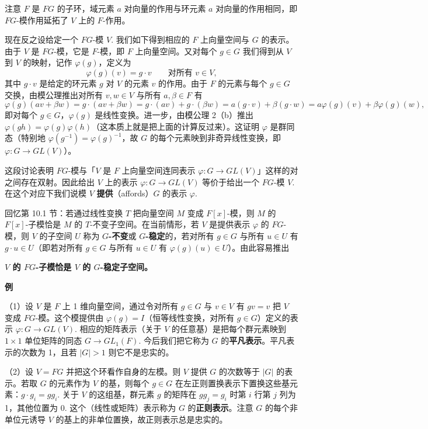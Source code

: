 注意 \(F\) 是 \(FG\) 的子环，域元素 \(a\) 对向量的作用与环元素 \(a\) 对向量的作用相同，即 \(FG\)-模作用延拓了 \(V\) 上的 \(F\)-作用。

现在反之设给定一个 \(FG\)-模 \(V\). 我们如下得到相应的 \(F\) 上向量空间与 \(G\) 的表示。由于 \(V\) 是 \(FG\)-模，它是 \(F\)-模，即 \(F\) 上向量空间。又对每个 \(g \in G\) 我们得到从 \(V\) 到 \(V\) 的映射，记作 \(\varphi(g)\)，定义为
\[
\varphi(g)(v) = g \cdot v \qquad \text{对所有 } v \in V,
\]
其中 \(g \cdot v\) 是给定的环元素 \(g\) 对 \(V\) 的元素 \(v\) 的作用。由于 \(F\) 的元素与每个 \(g \in G\) 交换，由模公理推出对所有 \(v, w \in V\) 与所有 \(a, \beta \in F\) 有
\[
\varphi(g)(av+\beta w) = g \cdot (av+\beta w) = g \cdot (av)+g \cdot (\beta w) = a(g \cdot v)+\beta(g \cdot w) = a\varphi(g)(v)+\beta\varphi(g)(w),
\]
即对每个 \(g \in G\)，\(\varphi(g)\) 是线性变换。进一步，由模公理 2（b）推出 \(\varphi(gh) = \varphi(g)\varphi(h)\)（这本质上就是把上面的计算反过来）。这证明 \(\varphi\) 是群同态（特别地 \(\varphi(g^{-1}) = \varphi(g)^{-1}\)，故 \(G\) 的每个元素映到非奇异线性变换，即 \(\varphi : G \to GL(V)\)）。

这段讨论表明 \(FG\)-模与「\(V\) 是 \(F\) 上向量空间连同表示 \(\varphi : G \to GL(V)\)」这样的对之间存在双射。因此给出 \(V\) 上的表示 \(\varphi : G \to GL(V)\) 等价于给出一个 \(FG\)-模 \(V\). 在这个对应下我们说模 \(V\) \textbf{提供}（affords）\(G\) 的表示 \(\varphi\).

回忆第 10.1 节：若通过线性变换 \(T\) 把向量空间 \(M\) 变成 \(F[x]\)-模，则 \(M\) 的 \(F[x]\)-子模恰是 \(M\) 的 \(T\)-不变子空间。在当前情形，若 \(V\) 是提供表示 \(\varphi\) 的 \(FG\)-模，则 \(V\) 的子空间 \(U\) 称为 \textbf{\(G\)-不变}或 \textbf{\(G\)-稳定}的，若对所有 \(g \in G\) 与所有 \(u \in U\) 有 \(g \cdot u \in U\)（即若对所有 \(g \in G\) 与所有 \(u \in U\) 有 \(\varphi(g)(u) \in U\)）。由此容易推出

\noindent\textbf{\(V\) 的 \(FG\)-子模恰是 \(V\) 的 \(G\)-稳定子空间。}

\noindent\textbf{例}

（1）设 \(V\) 是 \(F\) 上 1 维向量空间，通过令对所有 \(g \in G\) 与 \(v \in V\) 有 \(gv = v\) 把 \(V\) 变成 \(FG\)-模。这个模提供由 \(\varphi(g) = I\)（恒等线性变换，对所有 \(g \in G\)）定义的表示 \(\varphi : G \to GL(V)\). 相应的矩阵表示（关于 \(V\) 的任意基）是把每个群元素映到 \(1 \times 1\) 单位矩阵的同态 \(G \to GL_1(F)\). 今后我们把它称为 \(G\) 的\textbf{平凡表示}。平凡表示的次数为 1，且若 \(|G| > 1\) 则它不是忠实的。

（2）设 \(V = FG\) 并把这个环看作自身的左模。则 \(V\) 提供 \(G\) 的次数等于 \(|G|\) 的表示。若取 \(G\) 的元素作为 \(V\) 的基，则每个 \(g \in G\) 在左正则置换表示下置换这些基元素：\(g \cdot g_i = gg_i\). 关于 \(V\) 的这组基，群元素 \(g\) 的矩阵在 \(gg_j = g_i\) 时第 \(i\) 行第 \(j\) 列为 1，其他位置为 0. 这个（线性或矩阵）表示称为 \(G\) 的\textbf{正则表示}。注意 \(G\) 的每个非单位元诱导 \(V\) 的基上的非单位置换，故正则表示总是忠实的。

